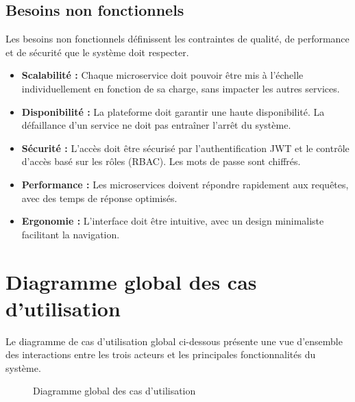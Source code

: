 \subsection{Besoins non fonctionnels}
Les besoins non fonctionnels définissent les contraintes de qualité, de performance et de sécurité que le système doit respecter.
\begin{itemize}
    \item[•] \textbf{Scalabilité :} Chaque microservice doit pouvoir être mis à l'échelle individuellement en fonction de sa charge, sans impacter les autres services.
    \item[•] \textbf{Disponibilité :} La plateforme doit garantir une haute disponibilité. La défaillance d'un service ne doit pas entraîner l'arrêt du système.
    \item[•] \textbf{Sécurité :} L'accès doit être sécurisé par l'authentification JWT et le contrôle d'accès basé sur les rôles (RBAC). Les mots de passe sont chiffrés.
    \item[•] \textbf{Performance :} Les microservices doivent répondre rapidement aux requêtes, avec des temps de réponse optimisés.
    \item[•] \textbf{Ergonomie :} L'interface doit être intuitive, avec un design minimaliste facilitant la navigation.
\end{itemize}

\section{Diagramme global des cas d'utilisation}

Le diagramme de cas d'utilisation global ci-dessous présente une vue d'ensemble des interactions entre les trois acteurs et les principales fonctionnalités du système.

\begin{figure}[H]
    \centering
    \caption{Diagramme global des cas d'utilisation}
    \label{fig:use_case_global}
\end{figure}


